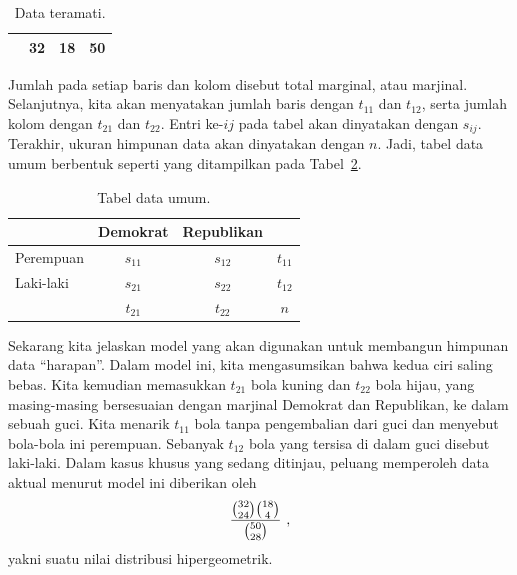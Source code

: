 \begin{example}
\begin{table}
\begin{tabular}{|l|c|c|c|}
       & 32                  & 18               & \hspace{.2in} 50  \\ \hline
\end{tabular}
\caption{Data teramati.}
\label{table 5.2}
\end{table}
Jumlah pada setiap baris dan kolom disebut total marginal, atau marjinal. Selanjutnya,
kita akan menyatakan jumlah baris dengan $t_{11}$ dan $t_{12}$, serta jumlah kolom
dengan $t_{21}$ dan $t_{22}$. Entri ke-$ij$ pada tabel akan dinyatakan dengan
$s_{ij}$. Terakhir, ukuran himpunan data akan dinyatakan dengan $n$. Jadi, tabel data
umum berbentuk seperti yang ditampilkan pada Tabel~\ref{table 5.3}.
\begin{table}
\centering
\begin{tabular}{|l|c|c|c|}
\hline
 & \hspace{.15in}Demokrat\hspace{.15in} & \hspace{.1in}Republikan\hspace{.1in} & \\ \hline 
\hspace{.1in}Perempuan & $s_{11}$ & $s_{12}$ & \hspace{.2in}$t_{11}$\hspace{.2in}\\ \hline
\hspace{.1in}Laki-laki   & $s_{21}$ & $s_{22}$ & \hspace{.2in}$t_{12}$\\ \hline
                    & $t_{21}$ & $t_{22}$ & \hspace{.2in}$n$\\ \hline
\end{tabular}
\caption{Tabel data umum.}
\label{table 5.3}
\end{table}
Sekarang kita jelaskan model yang akan digunakan untuk membangun himpunan data
``harapan''. Dalam model ini, kita mengasumsikan bahwa kedua ciri saling bebas. Kita
kemudian memasukkan $t_{21}$ bola kuning dan $t_{22}$ bola hijau, yang masing-masing
bersesuaian dengan marjinal Demokrat dan Republikan, ke dalam sebuah guci. Kita menarik
$t_{11}$ bola tanpa pengembalian dari guci dan menyebut bola-bola ini perempuan.
Sebanyak $t_{12}$ bola yang tersisa di dalam guci disebut laki-laki. Dalam kasus
khusus yang sedang ditinjau, peluang memperoleh data aktual menurut model ini
diberikan oleh
$${{{{32}\choose{24}}{{18}\choose{4}}}\over{{{50}\choose{28}}}}\ ,$$
yakni suatu nilai distribusi hipergeometrik.
\par

\end{example}
